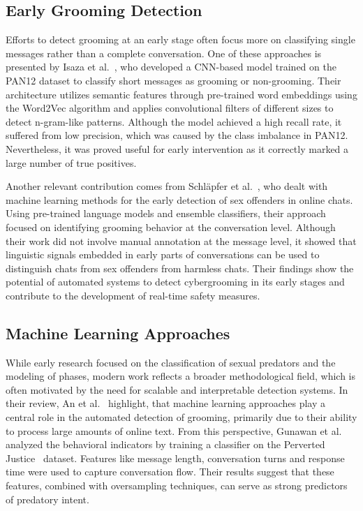 \subsection{Early Grooming Detection}
Efforts to detect grooming at an early stage often focus more on classifying single messages rather than a complete conversation. One of these approaches is presented by Isaza et al.~\cite{Isaza2022classifying}, who developed a CNN-based model trained on the PAN12 dataset to classify short messages as grooming or non-grooming. Their architecture utilizes semantic features through pre-trained word embeddings using the Word2Vec algorithm and applies convolutional filters of different sizes to detect n-gram-like patterns. Although the model achieved a high recall rate, it suffered from low precision, which was caused by the class imbalance in PAN12. Nevertheless, it was proved useful for early intervention as it correctly marked a large number of true positives.  %

Another relevant contribution comes from Schläpfer et al.~\cite{schlaepfer2022online}, who dealt with machine learning methods for the early detection of sex offenders in online chats. Using pre-trained language models and ensemble classifiers, their approach focused on identifying grooming behavior at the conversation level. Although their work did not involve manual annotation at the message level, it showed that linguistic signals embedded in early parts of conversations can be used to distinguish chats from sex offenders from harmless chats. Their findings show the potential of automated systems to detect cybergrooming in its early stages and contribute to the development of real-time safety measures. %



\subsection{Machine Learning Approaches}

While early research focused on the classification of sexual predators and the modeling of phases, modern work reflects a broader methodological field, which is often motivated by the need for scalable and interpretable detection systems. In their review, An et al.~\cite{an2025cybergrooming} highlight, that machine learning approaches play a central role in the automated detection of grooming, primarily due to their ability to process large amounts of online text. 
From this perspective, Gunawan et al. ~\cite{gunawan2016detecting} analyzed the behavioral indicators by training a classifier on the Perverted Justice~\cite{pj} dataset. Features like message length, conversation turns and response time were used to capture conversation flow. Their results suggest that these features, combined with oversampling techniques, can serve as strong predictors of predatory intent.

